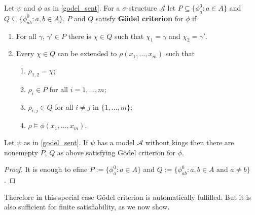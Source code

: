\begin{defn} Let $\psi$ and $\phi$ as in \ref{godel_sent}. 
For a $\sigma$-structure $\mathcal{A}$ let $P \subseteq \{\phi^0 _a : a \in A\}$ and $Q\subseteq \{\phi^0 _{ab} : a,b \in A\} $. $P$ and $Q$ satisfy \textbf{G\"odel criterion} for $\phi$ if 
\begin{enumerate} 
\item \label{godel_uno} For all $\gamma$, $\gamma' \in P$ there is $\chi \in Q$ such that $\chi_1 =\gamma$ and $\chi_2 =\gamma'$. 
\item \label{godel_due} Every $\chi \in Q$ can be extended to $\rho(x_1, \ldots, x_m)$ such that 
\begin{enumerate} 
\item $\rho_{1,2}=\chi$;
\item $\rho_{i} \in P$ for all $i=1, \ldots, m$;
\item $\rho_{i,j} \in Q$ for all $i\neq j$ in $\{1, \ldots, m\}$;
\item $\rho \models \phi(x_1, \ldots, x_m)$. 
\end{enumerate}
\end{enumerate} 
\end{defn} 

\begin{lem} Let $\psi$ as in \ref{godel_sent}. 
If $\psi$ has a model $\mathcal{A}$ without kings then there are nonemepty $P$, $Q$ as above satisfying G\"odel criterion for $\phi$. 
\begin{proof} It is enough to efine $P:=\{\phi^0 _a : a \in A\}$ and $Q:=\{\phi^0 _{ab} : a,b \in A \text{ and } a\neq b\} $. 
\end{proof}
\end{lem}

Therefore in this special case G\"odel criterion is automatically fulfilled. 
But it is also sufficient for finite satisfiability, as we now show.  

